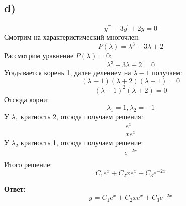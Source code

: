 \documentclass[a4paper, 12pt]{article}
\begin{document}
\subsection*{d)}
\[
y^{'''} - 3y^{'} +2y = 0
\]
Смотрим на характеристический многочлен:
\[
P(\lambda) = \lambda^3 - 3\lambda + 2
\]
Рассмотрим уравнение $P(\lambda) = 0$:
\[
\lambda^3 - 3\lambda + 2 = 0
\]
Угадывается корень 1, далее делением на $\lambda - 1$ получаем:
\[
 (\lambda -1) (\lambda + 2)(\lambda - 1)= 0
\]
\[
(\lambda -1)^2 (\lambda + 2) = 0
\]
Отсюда корни:
\[
\lambda_1 = 1, \lambda_2 = -1
\]
У $\lambda_1$ кратность 2, отсюда получаем решения:
\[
      \begin{gathered} 
e^{x}  \\
x e^{x} 
      \end{gathered} 
\]
У $\lambda_2$ кратность 1, отсюда получаем решение:
\[
      \begin{gathered} 
e^{-2x} \\
      \end{gathered} 
\]
Итого решение:
\[
C_1e^x + C_2 xe^x + C_3e^{-2x}
\]
\begin{center}
\textbf{Ответ: } 
\[
y = C_1e^x + C_2 xe^x + C_3e^{-2x}
\]
\end{center}
\clearpage
\end{document}
